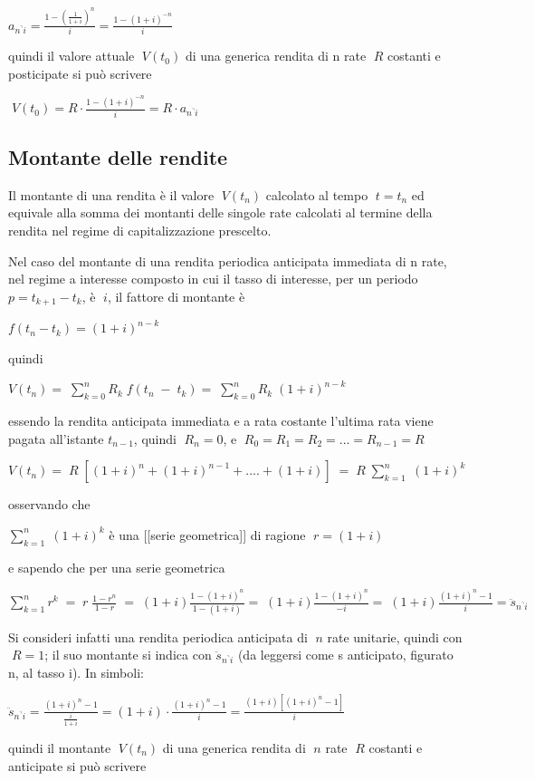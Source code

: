$a_{n^\urcorner i}= \frac{1-(\frac{1}{1+i})^{n}}{i}= \frac{1-(1+i)^{-n}}{i}$

quindi il valore attuale $\; V(t_0)$ di una generica rendita di n rate $\; R$ 
costanti e posticipate si può scrivere

$\; V(t_0)= R\cdot\frac{1-(1+i)^{-n}}{i}= R\cdot a_{n^\urcorner i}$

\subsection{Montante delle rendite}
Il montante di una rendita è il valore $\;V(t_n)$ calcolato al tempo $\;t=t_n$ 
ed equivale alla somma dei montanti delle singole rate calcolati al termine 
della rendita nel regime di capitalizzazione prescelto.


Nel caso del montante di una rendita periodica anticipata immediata di n rate, 
nel regime a interesse composto in cui il tasso di interesse, per un periodo 
$p= t_{k+1}-t_k$, è $\;i$, il fattore di montante è

$f(t_n-t_k)=(1+i)^{n-k}$

quindi

$V(t_n)=\; \sum^{n}_{k=0}R_k\; f(t_n\;-\;t_k)= \; \sum^{n}_{k=0}R_k\; 
(1+i)^{n-k}$

essendo la rendita anticipata immediata e a rata costante l'ultima rata viene 
pagata all'istante $t_{n-1}$, quindi $\;R_n=0$, e 
$\;R_{0}=R_{1}=R_{2}=...=R_{n-1}=R$

$V(t_n)=\;R \;\left[(1+i)^n+(1+i)^{n-1}+....+(1+i)\right]\;=\;R\; 
\sum^{n}_{k=1}\; (1+i)^{k}$

osservando che

$\sum^{n}_{k=1}\; (1+i)^{k}$ è una [[serie geometrica]] di ragione $\;r=(1+i)$

e sapendo che per una serie geometrica

$\sum^{n}_{k=1}r^k\; = \;r\; \frac{1-r^n}{1-r}\; = 
\;(1+i)\frac{1-(1+i)^n}{1-(1+i)} = \;(1+i)\frac{1-(1+i)^n}{-i} = 
\;(1+i)\frac{(1+i)^n-1}{i} = \ddot{s}_{n^\urcorner i}$

Si consideri infatti una rendita periodica anticipata di $\;n$ rate unitarie, 
quindi con $\;R=1$; il suo montante si indica con $\ddot{s}_{n^\urcorner i}$ 
(da leggersi come s anticipato, figurato n, al tasso i). 
In simboli:

$\ddot{s}_{n^\urcorner i} = \frac{(1+i)^{n}-1}{\frac{i}{1+i}} = 
(1+i)\cdot\frac{(1+i)^{n}-1}{i} = \frac{(1+i)[(1+i)^{n}-1]}{i}$

quindi il montante $\; V(t_n)$ di una generica rendita di $\;n$ rate $\;R$ 
costanti e anticipate si può scrivere

